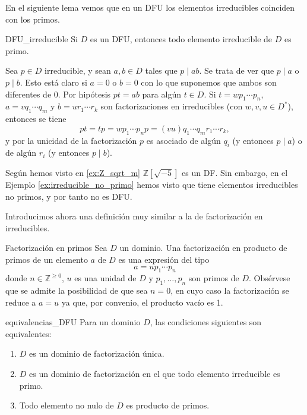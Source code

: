En el siguiente lema vemos que en un DFU los elementos irreducibles coinciden con los primos.

\begin{lemma}{}{DFU_irreducible}
Si \(D\) es un DFU, entonces todo elemento irreducible de \(D\) es primo.
\end{lemma}

\begin{proofbox}
Sea \(p \in D\) irreducible, y sean \(a, b \in D\) tales que \(p \mid ab\). Se trata de ver que \(p \mid a\) o \(p \mid b\). Esto está claro si \(a = 0\) o \(b = 0\) con lo que suponemos que ambos son diferentes de 0. Por hipótesis \(pt = ab\) para algún \(t \in D\). Si \(t = w p_1 \cdots p_n\), \(a = v q_1 \cdots q_m\) y \(b = u r_1 \cdots r_k\) son factorizaciones en irreducibles (con \(w, v, u \in D^*\)), entonces se tiene
\[
pt = tp = w p_1 \cdots p_n p  = (vu) q_1 \cdots q_m r_1 \cdots r_k,
\]
y por la unicidad de la factorización \(p\) es asociado de algún \(q_i\) (y entonces \(p \mid a\)) o de algún \(r_i\) (y entonces \(p \mid b\)).
\end{proofbox}

Según hemos visto en \ref{ex:Z_sqrt_m} \(\mathbb{Z}[\sqrt{-5}]\) es un DF. Sin embargo, en el Ejemplo \ref{ex:irreducible_no_primo} hemos visto que tiene elementos irreducibles no primos, y por tanto no es DFU.

Introducimos ahora una definición muy similar a la de factorización en irreducibles.
\begin{definition}{Factorización en primos}{}
Sea \(D\) un dominio. Una factorización en producto de primos de un elemento \(a\) de \(D\) es una expresión del tipo
\[
a = u p_1 \cdots p_n
\]
donde \(n \in \mathbb{Z}^{\geq 0}\), \(u\) es una unidad de \(D\) y \(p_1, \ldots, p_n\) son primos de \(D\). Obsérvese que se admite la posibilidad de que sea $n = 0$, en cuyo caso la factorización se reduce a $a = u$ ya que, por convenio, el producto vacío es 1.
\end{definition}

\begin{proposition}{}{equivalencias_DFU}
Para un dominio \(D\), las condiciones siguientes son equivalentes:

\begin{enumerate}
\item \(D\) es un dominio de factorización única.

\item \(D\) es un dominio de factorización en el que todo elemento irreducible es primo.

\item Todo elemento no nulo de \(D\) es producto de primos.
\end{enumerate}

\end{proposition}

